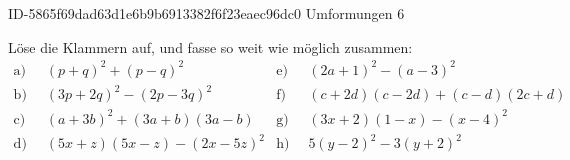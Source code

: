 \begin{exercise}
      {ID-5865f69dad63d1e6b9b6913382f6f23eaec96dc0}
      {Umformungen 6}
  \ifproblem\problem\par
    \newcommand{\gap}{\;\;}%
    Löse die Klammern auf, und fasse so weit wie möglich zusammen:
    \begin{align*}
      \text{a)}\gap & (p+q)^2+(p-q)^2 &
      \text{e)}\gap & (2a+1)^2-(a-3)^2
      \\
      \text{b)}\gap & (3p+2q)^2-(2p-3q)^2 &
      \text{f)}\gap & (c+2d)(c-2d)+(c-d)(2c+d)
      \\
      \text{c)}\gap & (a+3b)^2+(3a+b)(3a-b) &
      \text{g)}\gap & (3x+2)(1-x)-(x-4)^2
      \\
      \text{d)}\gap & (5x+z)(5x-z)-(2x-5z)^2 &
      \text{h)}\gap & 5(y-2)^2-3(y+2)^2
    \end{align*}
  \fi
  \ifoutcome\outcome\par
    \newcommand{\toprow}[2]
    {%
      \makebox[1.5em][r]{\ensuremath{\displaystyle#1}}%
      &\phantom{\,=\:\,}%
      \makebox[18.5em][l]{\ensuremath{\displaystyle#2}}%
    }%
    \newcommand{\solutionA}
    {%
      \begin{equation*}
        \begin{split}
          \toprow{\text{a)}}{(p+q)^2+(p-q)^2} \\
          &=p^2+2pq+q^2+p^2-2pq+q^2           \\
          &=p^2+p^2+2pq-2pq+q^2+q^2           \\
          &=2p^2+2q^2                         \\
          &=2\left(p^2+q^2\right)
        \end{split}
      \end{equation*}
    }%
    \newcommand{\solutionB}
    {%
      \begin{equation*}
        \begin{split}
          \toprow{\text{b)}}{(3p+2q)^2-(2p-3q)^2}      \\
          &=9p^2+12pq+4q^2-\left(4p^2-12pq+9q^2\right) \\
          &=9p^2+12pq+4q^2-4p^2+12pq-9q^2              \\
          &=9p^2-4p^2+12pq+12pq+4q^2-9q^2              \\
          &=5p^2+24pq-5q^2
        \end{split}

\end{equation*}}
\end{exercise}
